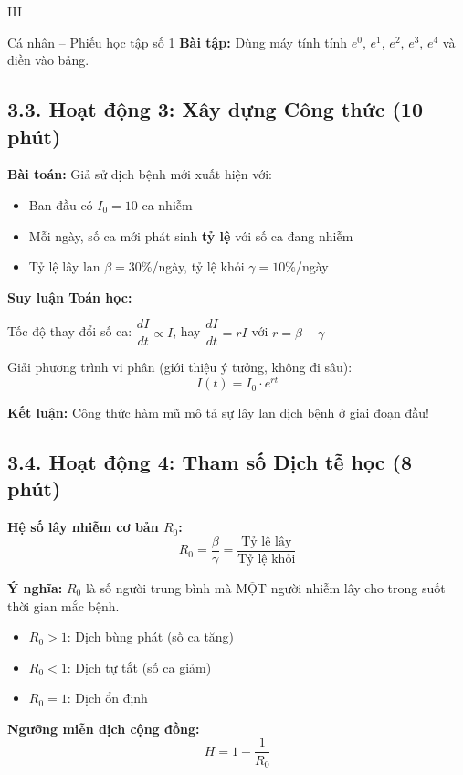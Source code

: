 \documentclass[12pt,a4paper]{article}
\begin{document}
\begin{competitionsection}{III}
\begin{taskbox}{Cá nhân -- Phiếu học tập số 1}
\textbf{Bài tập:} Dùng máy tính tính $e^0$, $e^1$, $e^2$, $e^3$, $e^4$ và điền vào bảng.
\end{taskbox}

\subsection*{3.3. Hoạt động 3: Xây dựng Công thức (10 phút)}

\begin{mathbox}
\textbf{Bài toán:} Giả sử dịch bệnh mới xuất hiện với:
\begin{itemize}
\item Ban đầu có $I_0 = 10$ ca nhiễm
\item Mỗi ngày, số ca mới phát sinh \textbf{tỷ lệ} với số ca đang nhiễm
\item Tỷ lệ lây lan $\beta = 30\%$/ngày, tỷ lệ khỏi $\gamma = 10\%$/ngày
\end{itemize}

\textbf{Suy luận Toán học:}

Tốc độ thay đổi số ca: $\dfrac{dI}{dt} \propto I$, hay $\dfrac{dI}{dt} = rI$ với $r = \beta - \gamma$

Giải phương trình vi phân (giới thiệu ý tưởng, không đi sâu): $$I(t) = I_0 \cdot e^{rt}$$

\textbf{Kết luận:} Công thức hàm mũ mô tả sự lây lan dịch bệnh ở giai đoạn đầu!
\end{mathbox}

\subsection*{3.4. Hoạt động 4: Tham số Dịch tễ học (8 phút)}

\begin{problembox}
\textbf{Hệ số lây nhiễm cơ bản $R_0$:}
$$R_0 = \frac{\beta}{\gamma} = \frac{\text{Tỷ lệ lây}}{\text{Tỷ lệ khỏi}}$$

\textbf{Ý nghĩa:} $R_0$ là số người trung bình mà MỘT người nhiễm lây cho trong suốt thời gian mắc bệnh.
\begin{itemize}
\item $R_0 > 1$: Dịch bùng phát (số ca tăng)
\item $R_0 < 1$: Dịch tự tắt (số ca giảm)
\item $R_0 = 1$: Dịch ổn định
\end{itemize}

\textbf{Ngưỡng miễn dịch cộng đồng:}
$$H = 1 - \frac{1}{R_0}$$


\end{problembox}
\end{competitionsection}
\end{document}
